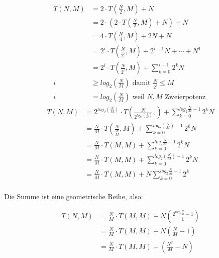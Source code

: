 \documentclass[parskip=half,a4paper]{scrartcl}
\begin{document}
\begin{equation*}
\begin{aligned}
    T(N, M) & =  2 \cdot T\left(\frac{N}{2}, M\right) + N\\
    & =  2 \cdot \left(2 \cdot T\left(\frac{N}{2}, M\right) + N\right) + N\\
    & =  4 \cdot T\left(\frac{N}{4}, M\right) + 2N + N\\
    & =  2^i \cdot T\left(\frac{N}{2^i}, M\right) + 2^{i-1}N + \cdots + N^{1}\\
    & =  2^i \cdot T\left(\frac{N}{2^i}, M\right) + \sum_{k=0}^{i-1} 2^kN \\
    i & \ge log_2\left(\frac{N}{M}\right) \text{ damit } \frac{N}{2^i} \le M \\
    i & = log_2\left(\frac{N}{M}\right) \text{ weil $N,M$ Zweierpotenz }
\end{aligned}
\end{equation*}
\begin{equation*}
\begin{aligned}
    T(N, M) & =  2^{log_2\left(\frac{N}{M}\right)} \cdot T\left(\frac{N}{2^{log_2\left(\frac{N}{M}\right)}}, \right) + \sum_{k=0}^{log_2\frac{N}{M}-1}{2^kN} \\
    & =  \frac{N}{M} \cdot T(\frac{N}{\frac{N}{M}}, M) + \sum_{k=0}^{log_2(\frac{N}{M})-1} 2^kN \\
    & =  \frac{N}{M} \cdot T(M, M) + \sum_{k=0}^{log_2\frac{N}{M}-1} 2^kN \\
    & =  \frac{N}{M} \cdot T(M, M) + \sum_{k=0}^{log_2(\frac{N}{M})-1} 2^kN \\
    & =  \frac{N}{M} \cdot T(M, M) + N \sum_{k=0}^{log_2\frac{N}{M}-1} 2^k \\
\end{aligned}
\end{equation*}
\begin{center}
Die Summe ist eine geometrische Reihe, also:
\end{center}
\begin{equation*}
\begin{aligned}
    T(N, M) & =  \frac{N}{M} \cdot T(M, M) + N \left(\frac{2^{log_2\frac{N}{M}} - 1}{1}\right) \\
    & =  \frac{N}{M} \cdot T(M, M) + N \left(\frac{N}{M} - 1\right) \\
    & =  \frac{N}{M} \cdot T(M, M) + \left(\frac{N^2}{M} - N\right)
\end{aligned}
\end{equation*}
\end{document}
